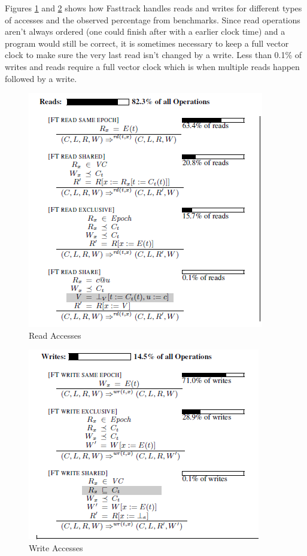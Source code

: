\documentclass{acm_proc_article-sp}
\begin{document}
Figures \ref{read} and \ref{write} shows how Fasttrack handles reads and writes for different types of accesses and the observed percentage from benchmarks. Since read operations aren't always ordered (one could finish after with a earlier clock time) and a program would still be correct, it is sometimes necessary to keep a full vector clock to make sure the very last read isn't changed by a write. Less than 0.1\% of writes and reads require a full vector clock which is when multiple reads happen followed by a write.
 \begin{figure}[h]
    \centering
    \includegraphics[scale=.5]{fast_read}
	\caption{Read Accesses\label{read}}
 \end{figure}
\begin{figure}[h]
    \includegraphics[scale=.5]{fast_write}
\caption{Write Accesses\label{write}}
  \end{figure}
\end{document}

